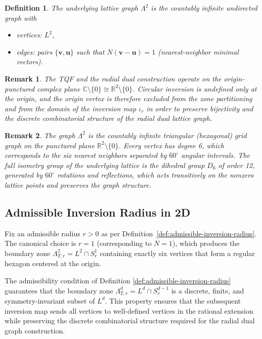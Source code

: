 \documentclass{article}
\newtheorem{definition}{Definition}
\newtheorem{remark}{Remark}
\begin{document}
\begin{definition}
\label{def:2d-lattice-graph}
The \emph{underlying lattice graph} $\Lambda^2$ is the countably infinite undirected graph with
\begin{itemize}
  \item vertices: $L^2$,
  \item edges: pairs $\{\mathbf{v}, \mathbf{u}\}$ such that $N(\mathbf{v} - \mathbf{u}) = 1$ (nearest-neighbor minimal vectors).
\end{itemize}
\end{definition}

\begin{remark}
\label{rem:punctured-plane}
The TQF and the radial dual construction operate on the origin-punctured complex plane $\mathbb{C} \setminus \{0\} \cong \mathbb{R}^2 \setminus \{0\}$. Circular inversion is undefined only at the origin, and the origin vertex is therefore excluded from the zone partitioning and from the domain of the inversion map $\iota_r$ in order to preserve bijectivity and the discrete combinatorial structure of the radial dual lattice graph.
\end{remark}

\begin{remark}
\label{rem:2d-graph-properties}
The graph $\Lambda^2$ is the countably infinite triangular (hexagonal) grid graph on the punctured plane $\mathbb{R}^2 \setminus \{0\}$. Every vertex has degree 6, which corresponds to the six nearest neighbors separated by $60^\circ$ angular intervals. The full isometry group of the underlying lattice is the dihedral group $D_6$ of order 12, generated by $60^\circ$ rotations and reflections, which acts transitively on the nonzero lattice points and preserves the graph structure.
\end{remark}

\subsection{Admissible Inversion Radius in 2D}
\label{subsec:2d-admissible-inversion-radius}

Fix an admissible radius $r > 0$ as per Definition~\ref{def:admissible-inversion-radius}. The canonical choice is $r = 1$ (corresponding to $N = 1$), which produces the boundary zone $\Lambda_{T,r}^2 = L^2 \cap S_r^1$ containing exactly six vertices that form a regular hexagon centered at the origin.

The admissibility condition of Definition \ref{def:admissible-inversion-radius} guarantees that the boundary zone $\Lambda_{T,r}^d = L^d \cap S_r^{d-1}$ is a discrete, finite, and symmetry-invariant subset of $L^d$. This property ensures that the subsequent inversion map sends all vertices to well-defined vertices in the rational extension while preserving the discrete combinatorial structure required for the radial dual graph construction.
\end{document}
